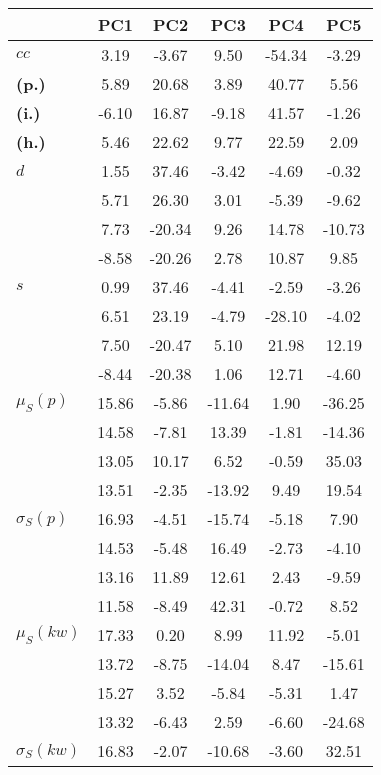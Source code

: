 \begin{table}[h!]
\begin{center}
\begin{tabular}{| l || c | c | c | c | c |}\hline
 & {\bf PC1} & {\bf PC2} & {\bf PC3} & {\bf PC4} & {\bf PC5} \\\hline\hline
{\bf $cc$} & 3.19 & -3.67 & 9.50 & -54.34 & -3.29 \\
{\bf (p.)} & 5.89 & 20.68 & 3.89 & 40.77 & 5.56 \\
{\bf (i.)} & -6.10 & 16.87 & -9.18 & 41.57 & -1.26 \\
{\bf (h.)} & 5.46 & 22.62 & 9.77 & 22.59 & 2.09 \\\hline
{\bf $d$} & 1.55 & 37.46 & -3.42 & -4.69 & -0.32 \\
{\bf } & 5.71 & 26.30 & 3.01 & -5.39 & -9.62 \\
{\bf } & 7.73 & -20.34 & 9.26 & 14.78 & -10.73 \\
{\bf } & -8.58 & -20.26 & 2.78 & 10.87 & 9.85 \\\hline
{\bf $s$} & 0.99 & 37.46 & -4.41 & -2.59 & -3.26 \\
{\bf } & 6.51 & 23.19 & -4.79 & -28.10 & -4.02 \\
 & 7.50  & -20.47  & 5.10  & 21.98  & 12.19 \\
 & -8.44  & -20.38  & 1.06  & 12.71  & -4.60 \\\hline
$\mu_S(p)$ & 15.86  & -5.86  & -11.64  & 1.90  & -36.25 \\
 & 14.58  & -7.81  & 13.39  & -1.81  & -14.36 \\
 & 13.05  & 10.17  & 6.52  & -0.59  & 35.03 \\
 & 13.51  & -2.35  & -13.92  & 9.49  & 19.54 \\\hline
$\sigma_S(p)$ & 16.93  & -4.51  & -15.74  & -5.18  & 7.90 \\
 & 14.53  & -5.48  & 16.49  & -2.73  & -4.10 \\
 & 13.16  & 11.89  & 12.61  & 2.43  & -9.59 \\
 & 11.58  & -8.49  & 42.31  & -0.72  & 8.52 \\\hline
$\mu_S(kw)$ & 17.33  & 0.20  & 8.99  & 11.92  & -5.01 \\
 & 13.72  & -8.75  & -14.04  & 8.47  & -15.61 \\
 & 15.27  & 3.52  & -5.84  & -5.31  & 1.47 \\
 & 13.32  & -6.43  & 2.59  & -6.60  & -24.68 \\\hline
$\sigma_S(kw)$ & 16.83  & -2.07  & -10.68  & -3.60  & 32.51 \\

\end{tabular}
\end{center}
\end{table}
